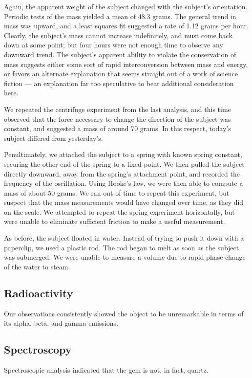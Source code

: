 \documentclass[10pt]{article}
\begin{document}
Again, the apparent weight of the subject changed with the subject's orientation.
Periodic tests of the mass yielded a mean of 48.3 grams.
The general trend in mass was upward, and a least squares fit suggested a rate of 1.12 grams per hour.
Clearly, the subject's mass cannot increase indefinitely, and must come back down at some point; but four hours were not enough time to observe any downward trend.
The subject's apparent ability to violate the conservation of mass suggests either some sort of rapid interconversion between mass and energy, or favors an alternate explanation that seems straight out of a work of science fiction --- an explanation far too speculative to bear additional consideration here.

We repeated the centrifuge experiment from the last analysis, and this time observed that the force necessary to change the direction of the subject was constant, and suggested a mass of around 70 grams.
In this respect, today's subject differed from yesterday's.

Penultimately, we attached the subject to a spring with known spring constant, securing the other end of the spring to a fixed point.
We then pulled the subject directly downward, away from the spring's attachment point, and recorded the frequency of the oscillation.
Using Hooke's law, we were then able to compute a mass of about 50 grams.
We ran out of time to repeat this experiment, but suspect that the mass measurements would have changed over time, as they did on the scale.
We attempted to repeat the spring experiment horizontally, but were unable to eliminate sufficient friction to make a useful measurement.

As before, the subject floated in water.
Instead of trying to push it down with a paperclip, we used a plastic rod.
The rod began to melt as soon as the subject was submerged.
We were unable to measure a volume due to rapid phase change of the water to steam.

\subsection{Radioactivity}
Our observations consistently showed the object to be unremarkable in terms of its alpha, beta, and gamma emissions.

\subsection{Spectroscopy}
Spectroscopic analysis indicated that the gem is not, in fact, quartz.
\end{document}
